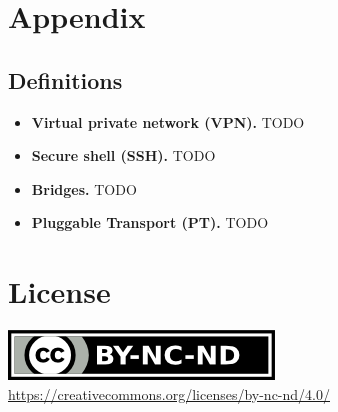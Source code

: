 \documentclass[sigconf, screen]{acmart}
\begin{document}
\section{Appendix}
\label{s:appendix}

\subsection{Definitions}
\label{ss:definitions}
\begin{itemize}
	\item \textbf{Virtual private network (VPN).} TODO		%
	\item \textbf{Secure shell (SSH).} TODO 				%
	\item \textbf{Bridges.}	TODO 							%
	\item \textbf{Pluggable Transport (PT).} TODO 			%
\end{itemize}


\section*{License}
\label{s:license}
\begin{center}
	\includegraphics{by-nc-nd.png} \\
	\url{https://creativecommons.org/licenses/by-nc-nd/4.0/}
\end{center}
\end{document}
